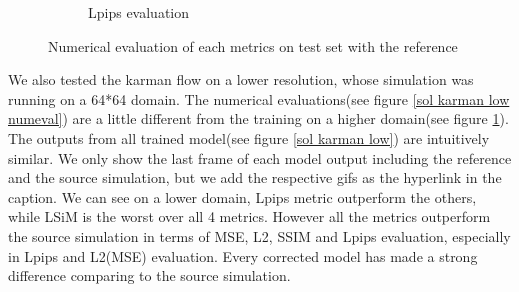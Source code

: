\documentclass[a4paper,12pt,twoside]{report}
\begin{document}
\begin{figure}
\begin{subfigure}{0.32\textwidth}
		\caption{Lpips evaluation}
	\end{subfigure}
	\caption{Numerical evaluation of each metrics on test set with the reference}
	\label{sol karman high numeval}
\end{figure}

We also tested the karman flow on a lower resolution, whose simulation was running on a 64*64 domain.
The numerical evaluations(see figure \ref{sol karman low numeval}) are a little different from the training on a higher domain(see figure \ref{sol karman high numeval}). The outputs from all trained model(see figure \ref{sol karman low}) are intuitively similar. We only show the last frame of each model output including the reference and the source simulation, but we add the respective gifs as the hyperlink in the caption.
We can see on a lower domain, Lpips metric outperform the others, while LSiM is the worst over all 4 metrics. However all the metrics outperform the source simulation in terms of MSE, L2, SSIM and Lpips evaluation, especially in Lpips and L2(MSE) evaluation. Every corrected model has made a strong difference comparing to the source simulation.  
\end{document}

